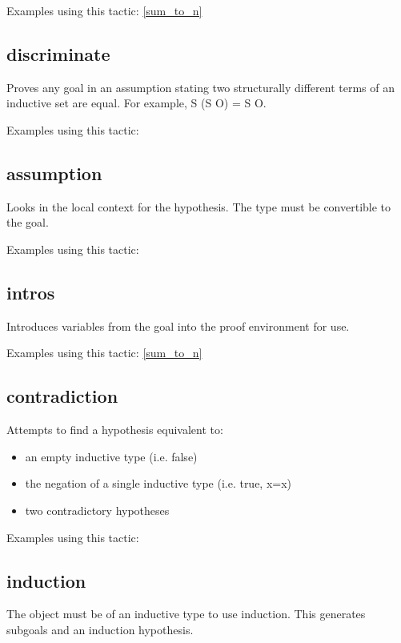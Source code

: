 \noindent
Examples using this tactic: 
\ref{sum_to_n}


\subsection{discriminate} \label{discriminate}
Proves any goal in an assumption stating two structurally different terms of an inductive set are equal. For example, S (S O) = S O.

\noindent
Examples using this tactic: 



\subsection{assumption} \label{assumption}
Looks in the local context for the hypothesis. The type must be convertible to the goal.

\noindent
Examples using this tactic: 



\subsection{intros} \label{intros}
Introduces variables from the goal into the proof environment for use.

\noindent
Examples using this tactic: 
\ref{sum_to_n}


\subsection{contradiction} \label{contradiction}
Attempts to find a hypothesis equivalent to:
\begin{itemize}
	\item an empty inductive type (i.e. false)
	\item the negation of a single inductive type (i.e. true, x=x)
	\item two contradictory hypotheses
\end{itemize}

\noindent
Examples using this tactic: 



\subsection{induction} \label{induction}
The object must be of an inductive type to use induction. 
This generates subgoals and an induction hypothesis.

